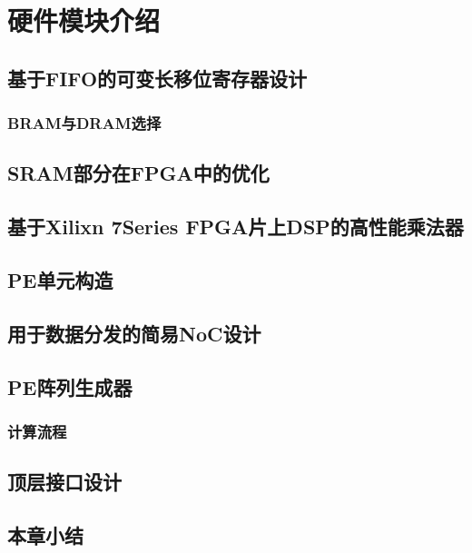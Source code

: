 \chapter{硬件模块介绍}

\section{基于FIFO的可变长移位寄存器设计}
    \subsection{BRAM与DRAM选择}

\section{SRAM部分在FPGA中的优化}

\section{基于Xilixn 7Series FPGA片上DSP的高性能乘法器}

\section{PE单元构造}

\section{用于数据分发的简易NoC设计}

\section{PE阵列生成器}
    \subsection{计算流程}

\section{顶层接口设计}

\section{本章小结}

